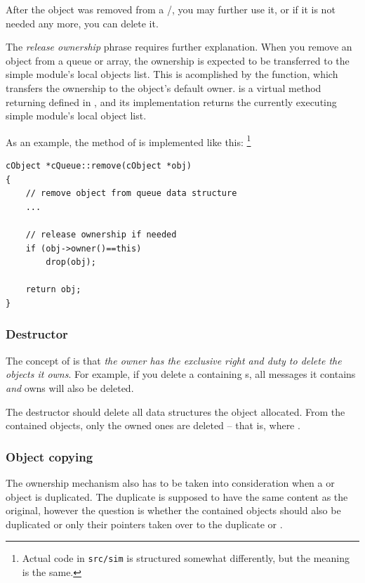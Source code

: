After the object was removed from a /,
you may further use it, or if it is not needed any more, you can delete it.

The \textit{release ownership} phrase requires further explanation.
When you remove an object from a queue or array, the ownership
is expected to be transferred to the simple module's local objects list.
This is acomplished by the  function, which transfers the
ownership to the object's default owner.
 is a virtual method returning 
defined in , and its implementation returns
the currently executing simple module's local object list.

As an example, the  method of  is
implemented like this:
  \footnote{Actual code in \texttt{src/sim} is structured somewhat
  differently, but the meaning is the same.}

\begin{verbatim}
cObject *cQueue::remove(cObject *obj)
{
    // remove object from queue data structure
    ...

    // release ownership if needed
    if (obj->owner()==this)
        drop(obj);

    return obj;
}
\end{verbatim}


\subsubsection{Destructor}

The concept of  is that \textit{the owner has the
exclusive right and duty to delete the objects it owns}.
For example, if you delete a  containing s,
all messages it contains \textit{and} owns will also be deleted.

The destructor should delete all data structures the object allocated.
From the contained objects, only the owned ones are deleted -- that is,
where .


\subsubsection{Object copying}

The ownership mechanism also has to be taken into consideration
when a  or  object is duplicated.
The duplicate is supposed to have the same content as the
original, however the question is whether the contained objects
should also be duplicated or only their pointers taken over
to the duplicate  or .

